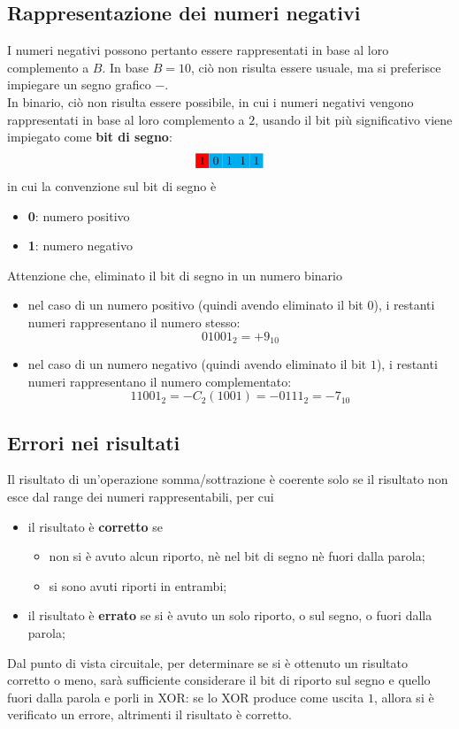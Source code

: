 \documentclass[a4paper]{extarticle}
\begin{document}
\subsection{Rappresentazione dei numeri negativi}
I numeri negativi possono pertanto essere rappresentati in base al loro complemento a $B$. In base $B=10$, ciò non risulta essere usuale, ma si preferisce impiegare un segno grafico $-$.\\
In binario, ciò non risulta essere possibile, in cui i numeri negativi vengono rappresentati in base al loro complemento a $2$, usando il bit più significativo viene impiegato come \textbf{bit di segno}:
\[\colorbox{red}{1}\colorbox{cyan}{0}\colorbox{cyan}{1}\colorbox{cyan}{1}\colorbox{cyan}{1}\]
in cui la convenzione sul bit di segno è
\begin{itemize}
    \item \textbf{0}: numero positivo
    \item \textbf{1}: numero negativo
\end{itemize}
Attenzione che, eliminato il bit di segno in un numero binario
\begin{itemize}
    \item nel caso di un numero positivo (quindi avendo eliminato il bit $0$), i restanti numeri rappresentano il numero stesso:
    \[01001_2=+9_{10}\]
    \item nel caso di un numero negativo (quindi avendo eliminato il bit $1$), i restanti numeri rappresentano il numero complementato:
    \[11001_2=-C_2(1001)=-0111_2=-7_{10}\]
\end{itemize}

\vspace{1em}
\noindent
\subsection{Errori nei risultati}
Il risultato di un'operazione somma/sottrazione è coerente solo se il risultato non esce dal range dei numeri rappresentabili, per cui
\begin{itemize}
    \item il risultato è \textbf{corretto} se
    \begin{itemize}
        \item non si è avuto alcun riporto, nè nel bit di segno nè fuori dalla parola;
        \item si sono avuti riporti in entrambi;
    \end{itemize}
    \item il risultato è \textbf{errato} se si è avuto un solo riporto, o sul segno, o fuori dalla parola;
\end{itemize}
Dal punto di vista circuitale, per determinare se si è ottenuto un risultato corretto o meno, sarà sufficiente considerare il bit di riporto sul segno e quello fuori dalla parola e porli in XOR: se lo XOR produce come uscita $1$, allora si è verificato un errore, altrimenti il risultato è corretto.
\end{document}
